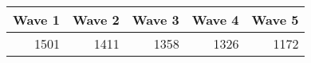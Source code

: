 
\begin{tabular}{r|r|r|r|r}
\hline
Wave 1 & Wave 2 & Wave 3 & Wave 4 & Wave 5\\
\hline
1501 & 1411 & 1358 & 1326 & 1172\\
\hline
\end{tabular}
